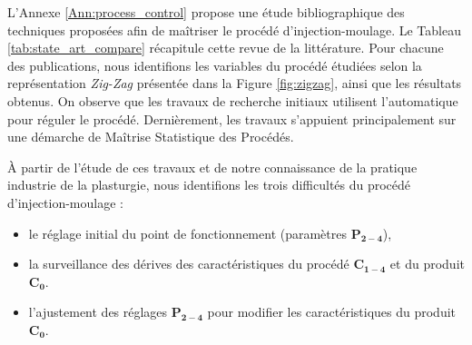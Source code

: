
\noindent
L'Annexe \ref{Ann:process_control} propose une étude bibliographique des techniques proposées afin de maîtriser le procédé d'injection-moulage.
Le Tableau \ref{tab:state_art_compare} récapitule cette revue de la littérature.
Pour chacune des publications, nous identifions les variables du procédé étudiées selon la représentation \textit{Zig-Zag} présentée dans la Figure \ref{fig:zigzag}, ainsi que les résultats obtenus.
On observe que les travaux de recherche initiaux utilisent l'automatique pour réguler le procédé.
Dernièrement, les travaux s'appuient principalement sur une démarche de Maîtrise Statistique des Procédés.  %

À partir de l'étude de ces travaux et de notre connaissance de la pratique industrie de la plasturgie, nous identifions les trois difficultés du procédé d'injection-moulage :
\begin{itemize}
	\item le réglage initial du point de fonctionnement (paramètres $\boldsymbol{P_{2-4}}$),
	\item la surveillance des dérives des caractéristiques du procédé $\boldsymbol{C_{1-4}}$ et du produit $\boldsymbol{C_{0}}$.
	\item l'ajustement des réglages $\boldsymbol{P_{2-4}}$ pour modifier les caractéristiques du produit $\boldsymbol{C_{0}}$.
\end{itemize}

